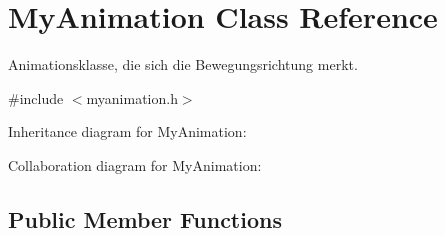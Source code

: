 \hypertarget{class_my_animation}{\section{My\-Animation Class Reference}
\label{class_my_animation}
}


Animationsklasse, die sich die Bewegungsrichtung merkt.  




{\ttfamily \#include $<$myanimation.\-h$>$}



Inheritance diagram for My\-Animation\-:


Collaboration diagram for My\-Animation\-:
\subsection*{Public Member Functions}
